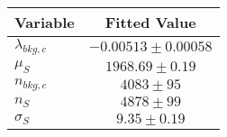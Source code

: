 \begin{tabular}[t]{lc}
\hline
Variable &Fitted Value\\
\hline\hline
$\lambda_{bkg,c}$&$-0.00513\pm0.00058$\\
\hline
$\mu_{S}$&$1968.69\pm0.19$\\
\hline
$n_{bkg,c}$&$4083\pm95$\\
\hline
$n_{S}$&$4878\pm99$\\
\hline
$\sigma_{S}$&$9.35\pm0.19$\\
\hline
\end{tabular}